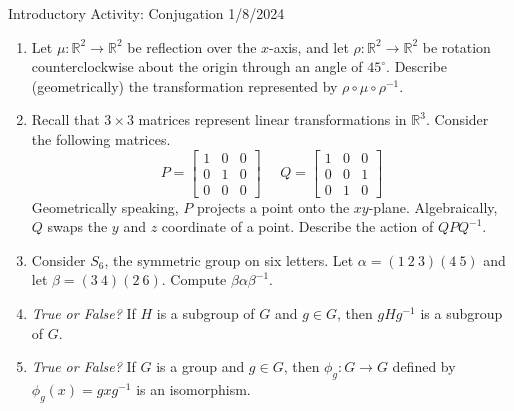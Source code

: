 \documentclass[10pt]{article}
\begin{document}
{\large Introductory Activity: Conjugation \hfill 1/8/2024}
\bigskip
  \begin{enumerate}
  \item Let $\mu: \mathbb{R}^2 \longrightarrow \mathbb{R}^2$  be reflection over the $x$-axis, and let $\rho: \mathbb{R}^2 \longrightarrow \mathbb{R}^2$ be rotation counterclockwise about the origin through an angle of $45^\circ$. Describe (geometrically) the transformation represented by $\rho \circ \mu \circ \rho^{-1}$.
  
  \item Recall that $3 \times 3$ matrices represent linear transformations in $\mathbb{R}^3$. Consider the following matrices.
$$
P = \begin{bmatrix} 1 & 0 & 0 \\ 0 & 1 & 0 \\ 0 & 0 & 0 \end{bmatrix}
\ \ \ \ \ \ 
Q = \begin{bmatrix} 1 & 0 & 0 \\ 0 & 0 & 1 \\ 0 & 1 & 0 \end{bmatrix}
$$
Geometrically speaking, $P$ projects a point onto the $xy$-plane. Algebraically, $Q$ swaps the $y$ and $z$ coordinate of a point. Describe the action of $QPQ^{-1}$.

\item Consider $S_6$, the symmetric group on six letters. Let $\alpha = (1 \ 2 \ 3)(4 \ 5)$ and let $\beta = (3 \ 4)(2 \ 6)$. Compute $\beta \alpha \beta^{-1}$.

\item \emph{True or False?} If $H$ is a subgroup of $G$ and $g \in G$, then $gHg^{-1}$ is a subgroup of $G$.

\item \emph{True or False?} If $G$ is a group and $g \in G$, then $\phi_g : G \longrightarrow G$ defined by $\phi_g(x) = gxg^{-1}$ is an isomorphism.

  \end{enumerate}
\end{document}
